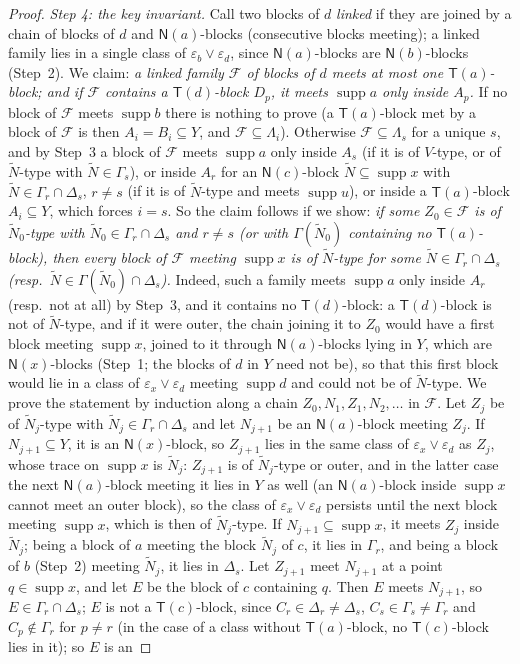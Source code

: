 \documentclass[11pt]{amsart}
\theoremstyle{definition}
\newcommand{\supp}{\operatorname{supp}}
\newcommand{\T}{\mathsf{T}}
\newcommand{\N}{\mathsf{N}}
\begin{document}
\begin{proof}
\smallskip
\emph{Step 4: the key invariant.} Call two blocks of $d$ \emph{linked} if they are joined by a chain of blocks of $d$ and $\N(a)$-blocks (consecutive blocks meeting); a linked family lies in a single class of $\varepsilon_b\vee\varepsilon_d$, since $\N(a)$-blocks are $\N(b)$-blocks (Step~2). We claim: \emph{a linked family $\mathcal F$ of blocks of $d$ meets at most one $\T(a)$-block; and if $\mathcal F$ contains a $\T(d)$-block $D_p$, it meets $\supp a$ only inside $A_p$.} If no block of $\mathcal F$ meets $\supp b$ there is nothing to prove (a $\T(a)$-block met by a block of $\mathcal F$ is then $A_i=B_i\subseteq Y$, and $\mathcal F\subseteq\Lambda_i$). Otherwise $\mathcal F\subseteq\Lambda_s$ for a unique $s$, and by Step~3 a block of $\mathcal F$ meets $\supp a$ only inside $A_s$ (if it is of $V$-type, or of $\tilde N$-type with $\tilde N\in\Gamma_s$), or inside $A_r$ for an $\N(c)$-block $\tilde N\subseteq\supp x$ with $\tilde N\in\Gamma_r\cap\Delta_s$, $r\ne s$ (if it is of $\tilde N$-type and meets $\supp u$), or inside a $\T(a)$-block $A_i\subseteq Y$, which forces $i=s$. So the claim follows if we show: \emph{if some $Z_0\in\mathcal F$ is of $\tilde N_0$-type with $\tilde N_0\in\Gamma_r\cap\Delta_s$ and $r\ne s$ (or with $\Gamma(\tilde N_0)$ containing no $\T(a)$-block), then every block of $\mathcal F$ meeting $\supp x$ is of $\tilde N$-type for some $\tilde N\in\Gamma_r\cap\Delta_s$ (resp.\ $\tilde N\in\Gamma(\tilde N_0)\cap\Delta_s$).} Indeed, such a family meets $\supp a$ only inside $A_r$ (resp.\ not at all) by Step~3, and it contains no $\T(d)$-block: a $\T(d)$-block is not of $\tilde N$-type, and if it were outer, the chain joining it to $Z_0$ would have a first block meeting $\supp x$, joined to it through $\N(a)$-blocks lying in $Y$, which are $\N(x)$-blocks (Step~1; the blocks of $d$ in $Y$ need not be), so that this first block would lie in a class of $\varepsilon_x\vee\varepsilon_d$ meeting $\supp d$ and could not be of $\tilde N$-type. We prove the statement by induction along a chain $Z_0,N_1,Z_1,N_2,\dots$ in $\mathcal F$. Let $Z_j$ be of $\tilde N_j$-type with $\tilde N_j\in\Gamma_r\cap\Delta_s$ and let $N_{j+1}$ be an $\N(a)$-block meeting $Z_j$. If $N_{j+1}\subseteq Y$, it is an $\N(x)$-block, so $Z_{j+1}$ lies in the same class of $\varepsilon_x\vee\varepsilon_d$ as $Z_j$, whose trace on $\supp x$ is $\tilde N_j$: $Z_{j+1}$ is of $\tilde N_j$-type or outer, and in the latter case the next $\N(a)$-block meeting it lies in $Y$ as well (an $\N(a)$-block inside $\supp x$ cannot meet an outer block), so the class of $\varepsilon_x\vee\varepsilon_d$ persists until the next block meeting $\supp x$, which is then of $\tilde N_j$-type. If $N_{j+1}\subseteq\supp x$, it meets $Z_j$ inside $\tilde N_j$; being a block of $a$ meeting the block $\tilde N_j$ of $c$, it lies in $\Gamma_r$, and being a block of $b$ (Step~2) meeting $\tilde N_j$, it lies in $\Delta_s$. Let $Z_{j+1}$ meet $N_{j+1}$ at a point $q\in\supp x$, and let $E$ be the block of $c$ containing $q$. Then $E$ meets $N_{j+1}$, so $E\in\Gamma_r\cap\Delta_s$; $E$ is not a $\T(c)$-block, since $C_r\in\Delta_r\ne\Delta_s$, $C_s\in\Gamma_s\ne\Gamma_r$ and $C_p\notin\Gamma_r$ for $p\ne r$ (in the case of a class without $\T(a)$-block, no $\T(c)$-block lies in it); so $E$ is an 
\end{proof}
\end{document}
